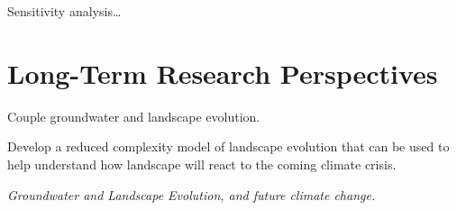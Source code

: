 Sensitivity analysis\dots
  

\section{Long-Term Research Perspectives}

Couple groundwater and landscape evolution.

Develop a reduced complexity model of landscape evolution that can be used to help understand how landscape will react to the coming climate crisis.

\emph{Groundwater and Landscape Evolution, and future climate change.}
